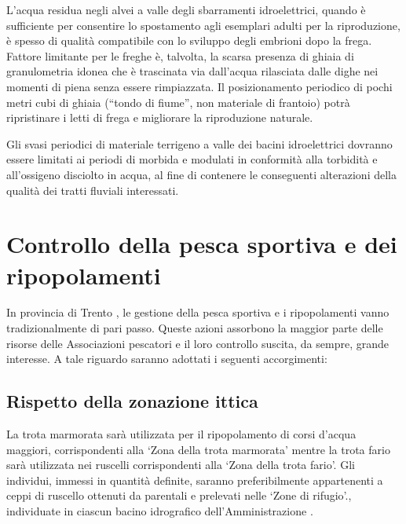 \documentclass[10pt,twoside,openany,x11names,svgnames,italian,a5paper,dvipsnames,table]{memoir}
\begin{document}
L’acqua residua negli alvei a valle degli sbarramenti idroelettrici, quando è sufficiente per consentire lo spostamento agli esemplari adulti per la riproduzione, è spesso di qualità compatibile con lo sviluppo degli embrioni dopo la frega. Fattore limitante per le freghe è, talvolta, la scarsa presenza di ghiaia di granulometria idonea che è trascinata via dall’acqua rilasciata dalle dighe nei momenti di piena senza essere rimpiazzata. Il posizionamento periodico di pochi metri cubi di ghiaia (“tondo di fiume”, non materiale di frantoio) potrà ripristinare i letti di frega e migliorare la riproduzione naturale.

Gli svasi periodici di materiale terrigeno a valle dei bacini idroelettrici dovranno essere limitati ai periodi di morbida e modulati in conformità alla torbidità e all’ossigeno disciolto in acqua, al fine di contenere le conseguenti alterazioni della qualità dei tratti fluviali interessati.

\section{Controllo della pesca sportiva e dei ripopolamenti}
In provincia di Trento , le gestione della pesca sportiva e i ripopolamenti vanno tradizionalmente di pari passo. Queste azioni assorbono la maggior parte delle risorse delle Associazioni pescatori e il loro controllo suscita, da sempre, grande interesse. A tale riguardo saranno adottati i seguenti accorgimenti:

\subsection{Rispetto della zonazione ittica}
La trota marmorata sarà utilizzata per il ripopolamento di corsi d’acqua maggiori, corrispondenti alla ‘Zona della trota marmorata’ mentre la trota fario sarà utilizzata nei ruscelli corrispondenti alla ‘Zona della trota fario’. Gli individui, immessi in quantità definite, saranno preferibilmente appartenenti a ceppi di ruscello ottenuti da parentali e prelevati nelle ‘Zone di rifugio’., individuate in ciascun bacino idrografico dell’Amministrazione \cite{Pontalti11}.
\end{document}
